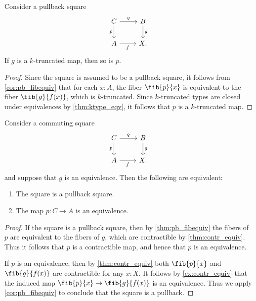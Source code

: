 \begin{cor}
Consider a pullback square
\begin{equation*}
\begin{tikzcd}
C \arrow[r,"q"] \arrow[d,swap,"p"] & B \arrow[d,"g"] \\
A \arrow[r,swap,"f"] & X.
\end{tikzcd}
\end{equation*}
If $g$ is a $k$-truncated map, then so is $p$.
\end{cor}

\begin{proof}
Since the square is assumed to be a pullback square, it follows from \cref{cor:pb_fibequiv} that for each $x:A$, the fiber $\fib{p}{x}$ is equivalent to the fiber $\fib{g}{f(x)}$, which is $k$-truncated. Since $k$-truncated types are closed under equivalences by \cref{thm:ktype_eqv}, it follows that $p$ is a $k$-truncated map.
\end{proof}

\begin{cor}\label{cor:pb_equiv}
Consider a commuting square
\begin{equation*}
\begin{tikzcd}
C \arrow[r,"q"] \arrow[d,swap,"p"] & B \arrow[d,"g"] \\
A \arrow[r,swap,"f"] & X.
\end{tikzcd}
\end{equation*}
and suppose that $g$ is an equivalence. Then the following are equivalent:
\begin{enumerate}
\item The square is a pullback square.
\item The map $p:C\to A$ is an equivalence.
\end{enumerate}
\end{cor}

\begin{proof}
If the square is a pullback square, then by \cref{thm:pb_fibequiv} the fibers of $p$ are equivalent to the fibers of $g$, which are contractible by \cref{thm:contr_equiv}. Thus it follows that $p$ is a contractible map, and hence that $p$ is an equivalence.

If $p$ is an equivalence, then by \cref{thm:contr_equiv} both $\fib{p}{x}$ and $\fib{g}{f(x)}$ are contractible for any $x:X$. It follows by \cref{ex:contr_equiv} that the induced map $\fib{p}{x}\to\fib{g}{f(x)}$ is an equivalence. Thus we apply \cref{cor:pb_fibequiv} to conclude that the square is a pullback.
\end{proof}

